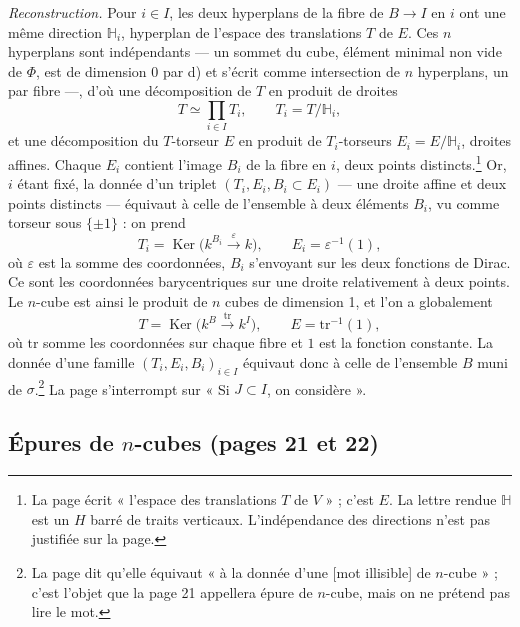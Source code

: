 \documentclass[11pt,a4paper]{article}
\begin{document}
\emph{Reconstruction.} Pour $i \in I$, les deux hyperplans de la fibre de
$B \to I$ en $i$ ont une même direction $\mathbb{H}_{i}$, hyperplan de l'espace
des translations $T$ de $E$. Ces $n$ hyperplans sont indépendants --- un sommet
du cube, élément minimal non vide de $\Phi$, est de dimension $0$ par d) et
s'écrit comme intersection de $n$ hyperplans, un par fibre ---, d'où une
décomposition de $T$ en produit de droites
\[
  T \simeq \prod_{i \in I} T_{i}, \qquad T_{i} = T/\mathbb{H}_{i},
\]
et une décomposition du $T$-torseur $E$ en produit de $T_{i}$-torseurs
$E_{i} = E/\mathbb{H}_{i}$, droites affines. Chaque $E_{i}$ contient l'image
$B_{i}$ de la fibre en $i$, deux points distincts.\footnote{La page écrit
« l'espace des translations $T$ de $V$ » ; c'est $E$. La lettre rendue
$\mathbb{H}$ est un $H$ barré de traits verticaux. L'indépendance des
directions n'est pas justifiée sur la page.} Or, $i$ étant fixé, la donnée d'un
triplet $(T_{i}, E_{i}, B_{i} \subset E_{i})$ --- une droite affine et deux
points distincts --- équivaut à celle de l'ensemble à deux éléments $B_{i}$, vu
comme torseur sous $\{\pm 1\}$ : on prend
\[
  T_{i} = \operatorname{Ker}\bigl(k^{B_{i}} \xrightarrow{\ \varepsilon\ } k\bigr),
  \qquad E_{i} = \varepsilon^{-1}(1),
\]
où $\varepsilon$ est la somme des coordonnées, $B_{i}$ s'envoyant sur les deux
fonctions de Dirac. Ce sont les coordonnées barycentriques sur une droite
relativement à deux points. Le $n$-cube est ainsi le produit de $n$ cubes de
dimension 1, et l'on a globalement
\[
  T = \operatorname{Ker}\bigl(k^{B} \xrightarrow{\ \mathrm{tr}\ } k^{I}\bigr),
  \qquad E = \mathrm{tr}^{-1}(1),
\]
où $\mathrm{tr}$ somme les coordonnées sur chaque fibre et $1$ est la fonction
constante. La donnée d'une famille $(T_{i}, E_{i}, B_{i})_{i \in I}$ équivaut
donc à celle de l'ensemble $B$ muni de $\sigma$.\footnote{La page dit qu'elle
équivaut « à la donnée d'une [mot illisible] de $n$-cube » ; c'est l'objet que
la page 21 appellera épure de $n$-cube, mais on ne prétend pas lire le mot.}
La page s'interrompt sur « Si $J \subset I$, on considère ».

\subsection*{Épures de $n$-cubes (pages 21 et 22)}
\end{document}
